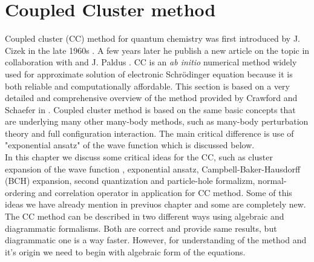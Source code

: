 \documentclass[twoside,english]{uiofysmaster}
\theoremstyle{definition}
\begin{document}
\chapter{Coupled Cluster method} \label{ch:coupled_cluster}
Coupled cluster (CC) method for quantum chemistry was first introduced by J. Cizek in the late 1960s \cite{cizekCorrelationProblemsAtomic}. A few years later he publish a new article on the topic in collaboration with and J. Paldus \cite{cizekCorrelationProblemAtomic1966}. CC is an \textit{ab initio} numerical method widely used for approximate solution of electronic Schrödinger equation because it is both reliable and computationally affordable. This section is based on a very detailed and comprehensive overview of the method provided by Crawford and Schaefer in \cite{crawfordIntroductionCoupledCluster2007}. Coupled cluster method is based on the same basic concepts that are underlying many other many-body methods, such as many-body perturbation theory and full configuration interaction. The main critical difference is use of "exponential ansatz" of the wave function which is discussed below.\\
In this chapter we discuss some critical ideas for the CC, such as cluster expansion of the wave function , exponential ansatz, Campbell-Baker-Hausdorff (BCH) expansion, second quantization and particle-hole formalizm, normal-ordering and correlation operator in application for CC method. Some of this ideas we have already mention in previuos chapter and some are completely new. The CC method can be described in two different ways using algebraic and diagrammatic formalisms. Both are correct and provide same results, but diagrammatic one is a way faster. However, for understanding of the method and it's origin we need to begin with algebraic form of the equations.\\
\end{document}
